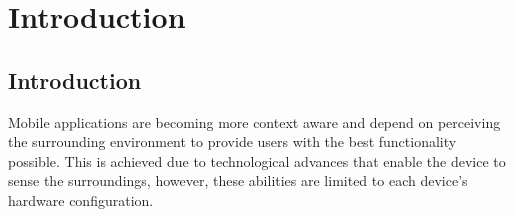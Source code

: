 


\chapter{Introduction}

\ifpdf
    \graphicspath{{1_introduction/figures/PNG/}{1_introduction/figures/PDF/}{1_introduction/figures/}}
\else
    \graphicspath{{1_introduction/figures/EPS/}{1_introduction/figures/}}
\fi







\section{Introduction} %

Mobile applications are becoming more context aware and depend on perceiving the surrounding environment to provide users with the best functionality possible. This is achieved due to technological advances that enable the device to sense the surroundings, however, these abilities are limited to each device's hardware configuration.

